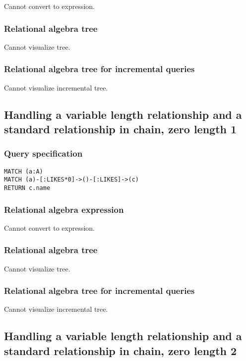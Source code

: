 Cannot convert to expression.

\subsubsection*{Relational algebra tree}

Cannot visualize tree.

\subsubsection*{Relational algebra tree for incremental queries}

Cannot visualize incremental tree.

\subsection{Handling a variable length relationship and a standard relationship in chain, zero length 1}

\subsubsection*{Query specification}

\begin{lstlisting}
MATCH (a:A)
MATCH (a)-[:LIKES*0]->()-[:LIKES]->(c)
RETURN c.name
\end{lstlisting}

\subsubsection*{Relational algebra expression}

Cannot convert to expression.

\subsubsection*{Relational algebra tree}

Cannot visualize tree.

\subsubsection*{Relational algebra tree for incremental queries}

Cannot visualize incremental tree.

\subsection{Handling a variable length relationship and a standard relationship in chain, zero length 2}


